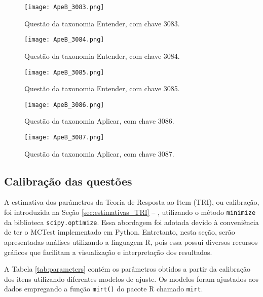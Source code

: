\begin{figure}[!ht]
    \centering
    \texttt{[image: ApeB\_3083.png]}
     \caption{Questão da taxonomia Entender, com chave 3083.}
  \label{fig:ApeB_3083}
\end{figure}

\begin{figure}[!ht]
    \centering
    \texttt{[image: ApeB\_3084.png]}
     \caption{Questão da taxonomia Entender, com chave 3084.}
  \label{fig:ApeB_3084}
\end{figure}

\begin{figure}[!ht]
    \centering
    \texttt{[image: ApeB\_3085.png]}
     \caption{Questão da taxonomia Entender, com chave 3085.}
  \label{fig:ApeB_3085}
\end{figure}

\begin{figure}[!ht]
    \centering
    \texttt{[image: ApeB\_3086.png]}
     \caption{Questão da taxonomia Aplicar, com chave 3086.}
  \label{fig:ApeB_3086}
\end{figure}

\begin{figure}[!ht]
    \centering
    \texttt{[image: ApeB\_3087.png]}
     \caption{Questão da taxonomia Aplicar, com chave 3087.}
  \label{fig:ApeB_3087}
\end{figure}

\subsection{Calibração das questões}\label{sec:calibracao}

A estimativa dos parâmetros da Teoria de Resposta ao Item (TRI), ou calibração, foi introduzida na Seção \ref{sec:estimativas_TRI} -- , utilizando o método \verb|minimize| da biblioteca \verb|scipy.optimize|. Essa abordagem foi adotada devido à conveniência de ter o MCTest implementado em Python. Entretanto, nesta seção, serão apresentadas análises utilizando a linguagem R, pois essa possui diversos recursos gráficos que facilitam a visualização e interpretação dos resultados.

A Tabela \ref{tab:parameters} contém os parâmetros obtidos a partir da calibração dos itens utilizando diferentes modelos de ajuste. Os modelos foram ajustados aos dados empregando a função \verb|mirt()| do pacote R chamado \verb|mirt|.

